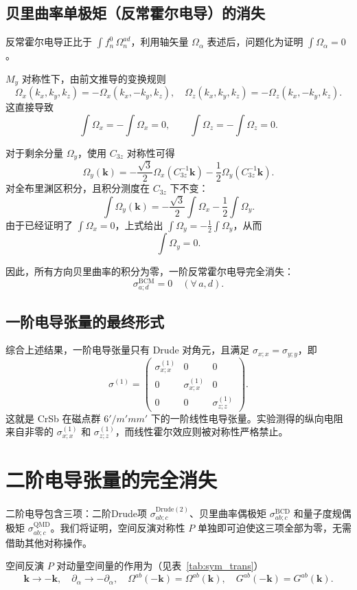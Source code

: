 \subsection{贝里曲率单极矩（反常霍尔电导）的消失}
反常霍尔电导正比于 \(\int f_n^0\,\Omega_n^{ad}\)，利用轴矢量 \(\Omega_\alpha\) 表述后，问题化为证明 \(\int \Omega_\alpha = 0\)。

\(M_y\) 对称性下，由前文推导的变换规则
\[
\Omega_x(k_x,k_y,k_z) = -\Omega_x(k_x,-k_y,k_z),\quad
\Omega_z(k_x,k_y,k_z) = -\Omega_z(k_x,-k_y,k_z).
\]
这直接导致
\[
\int \Omega_x = -\int \Omega_x = 0,\qquad \int \Omega_z = -\int \Omega_z = 0 .
\]

对于剩余分量 \(\Omega_y\)，使用 \(C_{3z}\) 对称性可得
\[
\Omega_y(\mathbf{k}) = -\frac{\sqrt3}{2}\Omega_x(C_{3z}^{-1}\mathbf{k}) - \frac12\Omega_y(C_{3z}^{-1}\mathbf{k}).
\]
对全布里渊区积分，且积分测度在 \(C_{3z}\) 下不变：
\[
\int \Omega_y(\mathbf{k}) = -\frac{\sqrt3}{2}\int \Omega_x - \frac12\int \Omega_y .
\]
由于已经证明了 \(\int \Omega_x = 0\)，上式给出 \(\int \Omega_y = -\frac12\int \Omega_y\)，从而
\[
\int \Omega_y = 0 .
\]

因此，所有方向贝里曲率的积分为零，一阶反常霍尔电导完全消失：
\[
\sigma_{a;d}^{\mathrm{BCM}} = 0 \quad (\forall\,a,d).
\]

\subsection{一阶电导张量的最终形式}
综合上述结果，一阶电导张量只有 Drude 对角元，且满足 \(\sigma_{x;x}=\sigma_{y;y}\)，即
\[
{\sigma^{(1)} = \begin{pmatrix}
\sigma_{x;x}^{(1)} & 0 & 0 \\
0 & \sigma_{x;x}^{(1)} & 0 \\
0 & 0 & \sigma_{z;z}^{(1)}
\end{pmatrix}} .
\]
这就是 CrSb 在磁点群 \(6'/m'mm'\) 下的一阶线性电导张量。实验测得的纵向电阻来自非零的 \(\sigma_{x;x}^{(1)}\) 和 \(\sigma_{z;z}^{(1)}\)，而线性霍尔效应则被对称性严格禁止。

\section{二阶电导张量的完全消失}
二阶电导包含三项：二阶Drude项 $\sigma_{ab;c}^{\mathrm{Drude}(2)}$、贝里曲率偶极矩 $\sigma_{ab;c}^{\mathrm{BCD}}$ 和量子度规偶极矩 $\sigma_{ab;c}^{\mathrm{QMD}}$。我们将证明，空间反演对称性 $P$ 单独即可迫使这三项全部为零，无需借助其他对称操作。

空间反演 $P$ 对动量空间量的作用为（见表~\ref{tab:sym_trans}）
\[
\mathbf{k} \to -\mathbf{k},\quad \partial_\alpha \to -\partial_\alpha,\quad
\Omega^{ab}(-\mathbf{k}) = \Omega^{ab}(\mathbf{k}),\quad
G^{ab}(-\mathbf{k}) = G^{ab}(\mathbf{k}) .
\]

